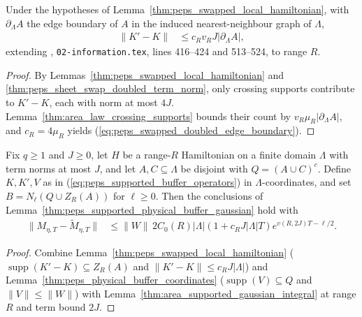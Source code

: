 \begin{lemma}
    \label{thm:peps_swapped_doubled_edge_boundary}
    \leanok
    Under the hypotheses of Lemma~\ref{thm:peps_swapped_local_hamiltonian},
    with $\partial_\Lambda A$ the edge boundary of $A$ in the induced
    nearest-neighbour graph of $\Lambda$,
    \begin{align}
        \|K'-K\| & \le c_Rv_RJ|\partial_\Lambda A|,
        \label{eq:peps_swapped_doubled_edge_boundary}
    \end{align}
    extending \cite{OpenAI2026PolynomialPEPS}, \texttt{02-information.tex},
    lines 416--424 and 513--524, to range $R$.
\end{lemma}
\begin{proof}
    \leanok
    By Lemmas~\ref{thm:peps_swapped_local_hamiltonian} and
    \ref{thm:peps_sheet_swap_doubled_term_norm}, only crossing supports
    contribute to $K'-K$, each with norm at most $4J$.
    Lemma~\ref{thm:area_law_crossing_supports} bounds their count by
    $v_R\mu_R|\partial_\Lambda A|$, and $c_R=4\mu_R$ yields
    (\ref{eq:peps_swapped_doubled_edge_boundary}).
\end{proof}

\begin{lemma}
    \label{thm:peps_supported_physical_buffer_gaussian_range}
    \leanok
    Fix $q\ge1$ and $J\ge0$, let $H$ be a range-$R$ Hamiltonian on a finite
    domain $\Lambda$ with term norms at most $J$, and let $A,C\subseteq\Lambda$
    be disjoint with $Q=(A\cup C)^c$. Define $K,K',V$ as in
    (\ref{eq:peps_supported_buffer_operators}) in $\Lambda$-coordinates, and
    set $B=N_\ell(Q\cup Z_R(A))$ for $\ell\ge0$. Then the conclusions of
    Lemma~\ref{thm:peps_supported_physical_buffer_gaussian} hold with
    \begin{align}
        \|M_{\eta,T}-\widetilde M_{\eta,T}\|
         & \le\|W\|\,2C_0(R)|\Lambda|(1+c_RJ|\Lambda|T)e^{v(R,2J)T-\ell/2}.
        \label{eq:peps_supported_buffer_range_bound}
    \end{align}
\end{lemma}
\begin{proof}
    \leanok
    Combine Lemma~\ref{thm:peps_swapped_local_hamiltonian}
    ($\operatorname{supp}(K'-K)\subseteq Z_R(A)$ and
    $\|K'-K\|\le c_RJ|\Lambda|$) and
    Lemma~\ref{thm:peps_physical_buffer_coordinates}
    ($\operatorname{supp}(V)\subseteq Q$ and $\|V\|\le\|W\|$) with
    Lemma~\ref{thm:area_supported_gaussian_integral} at range $R$ and term
    bound $2J$.
\end{proof}
